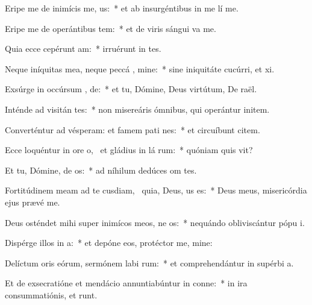 \item Eripe me de inimícis me,  us:~* et ab insurgéntibus in me lí me.
\item Eripe me de operántibus tem:~* et de viris sángui va me.
\item Quia ecce cepérunt  am:~* irruérunt in  tes.
\item Neque iníquitas mea, neque peccá , mine:~* sine iniquitáte cucúrri, et xi.
\item Exsúrge in occúrsum ,  de:~* et tu, Dómine, Deus virtútum, De raël.
\item Inténde ad visitán  tes:~* non misereáris ómnibus, qui operántur initem.
\item Converténtur ad vésperam: et famem pati  nes:~* et circuíbunt citem.
\item Ecce loquéntur in ore o,~\pscross{} et gládius in lá rum:~* quóniam quis vit?
\item Et tu, Dómine, de os:~* ad níhilum dedúces om tes.
\item Fortitúdinem meam ad te cusdiam,~\pscross{} quia, Deus,  us es:~* Deus meus, misericórdia ejus prævé me.
\item Deus osténdet mihi super inimícos meos, ne  os:~* nequándo obliviscántur pópu i.
\item Dispérge illos in  a:~* et depóne eos, protéctor me, mine:
\item Delíctum oris eórum, sermónem labi rum:~* et comprehendántur in supérbi a.
\item Et de exsecratióne et mendácio annuntiabúntur in conne:~* in ira consummatiónis, et  runt.
